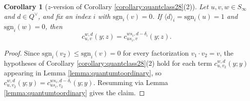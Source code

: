\documentclass{amsart}
\newtheorem{lemma}{Lemma}[section]
\newtheorem{corollary}[lemma]{Corollary}
\theoremstyle{definition}
\theoremstyle{remark}
\numberwithin{equation}{section}
\newcommand{\xrightsquigarrow}[2][]{%
	\mathrel{\mathop{\rightsquigarrow}\limits^{\scriptstyle #2}%
	\ifx\hfuzz#1\hfuzz\else_{\scriptstyle #1}\fi}%
}
\newcommand{\tom}[1]{\ensuremath{\xrightsquigarrow{#1}}}
\begin{document}
\begin{corollary}[$z$-version of Corollary \ref{corollary:quantclass28}(2)] \label{corollary:quantclass28z}
Let $u,v,w\in S_\infty$ and $d\in Q^\vee$, and fix an index $i$ with $\mathrm{sgn}_i(v)=0$. If $\langle d\rangle_i=\mathrm{sgn}_i(u)=1$ and $\mathrm{sgn}_i(w)=0$, then
$$c_{u,v}^{w,d}(y;z)=c_{us_i,v}^{ws_i,d-\delta_i}(y;z).$$
\end{corollary}
\begin{proof}
Since $\mathrm{sgn}_i(v_2)\leq \mathrm{sgn}_i(v)=0$ for every factorization $v_1\cdot v_2=v$, the hypotheses of Corollary \ref{corollary:quantclass28}(2) hold for each term $c_{u,v_2}^{w,d}(y;y)$ appearing in Lemma \ref{lemma:quantumtoordinary}, so $c_{u,v_2}^{w,d}(y;y)=c_{us_i,v_2}^{ws_i,d-\delta_i}(y;y)$. Resumming via Lemma \ref{lemma:quantumtoordinary} gives the claim.
\end{proof}


\end{document}
